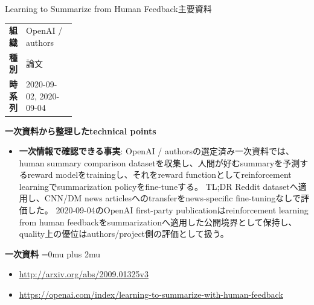 \begin{technicalnote}{Learning to Summarize from Human Feedback}{主要資料}
\begingroup
\begin{tabularx}{\linewidth}{@{}>{\bfseries}p{0.22\linewidth}X@{}}
組織 & OpenAI / authors \\
種別 & 論文 \\
時系列 & 2020-09-02, 2020-09-04 \\
\end{tabularx}
\smallskip
\begin{minipage}{\linewidth}
{\bfseries 一次資料から整理したtechnical points}
\begin{itemize}[leftmargin=1.5em,itemsep=0.35em]
\item \textbf{一次情報で確認できる事実}: OpenAI / authorsの選定済み一次資料では、human summary comparison datasetを収集し、人間が好むsummaryを予測するreward modelをtrainingし、それをreward functionとしてreinforcement learningでsummarization policyをfine-tuneする。 TL;DR Reddit datasetへ適用し、CNN/DM news articlesへのtransferをnews-specific fine-tuningなしで評価した。 2020-09-04のOpenAI first-party publicationはreinforcement learning from human feedbackをsummarizationへ適用した公開境界として保持し、quality上の優位はauthors/project側の評価として扱う。
\end{itemize}
\begin{samepage}
{\bfseries 一次資料}
\begingroup\sloppy
\Urlmuskip=0mu plus 2mu\relax
\begin{itemize}[leftmargin=1.5em,itemsep=0.25em]
\item {\scriptsize\url{http://arxiv.org/abs/2009.01325v3}}
\item {\scriptsize\url{https://openai.com/index/learning-to-summarize-with-human-feedback}}
\end{itemize}
\endgroup
\end{samepage}
\end{minipage}
\endgroup
\end{technicalnote}
\medskip
